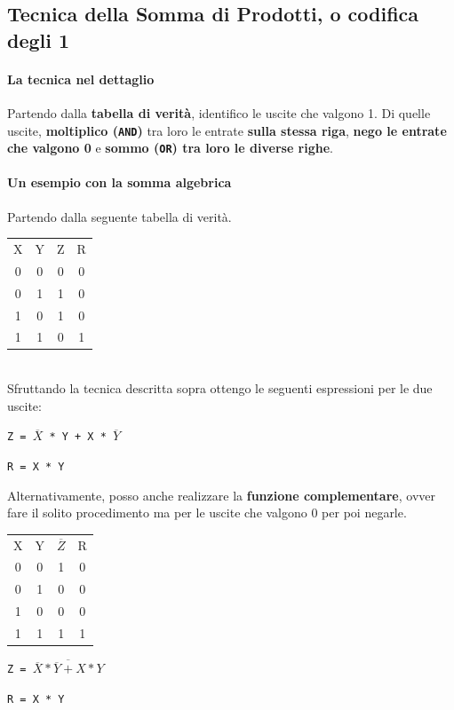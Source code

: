 \documentclass[10pt]{report}
\begin{document}
\subsection{Tecnica della Somma di Prodotti, o codifica degli 1}
\paragraph{La tecnica nel dettaglio} Partendo dalla \textbf{tabella di verità}, identifico le uscite che valgono 1. Di quelle uscite, \textbf{moltiplico (\texttt{AND})} tra loro le entrate \textbf{sulla stessa riga}, \textbf{nego le entrate che valgono 0} e \textbf{sommo (\texttt{OR}) tra loro le diverse righe}.
\paragraph{Un esempio con la somma algebrica} Partendo dalla seguente tabella di verità.\\
\begin{multicols}{2}
\begin{tabular}{cc|c|c}
X & Y & Z & R \\
0 & 0 & 0 & 0 \\
0 & 1 & 1 & 0 \\
1 & 0 & 1 & 0 \\
1 & 1 & 0 & 1\\
\end{tabular}
\columnbreak
\\Sfruttando la tecnica descritta sopra ottengo le seguenti espressioni per le due uscite:
\begin{list}{}{}
\item \texttt{Z = $\overline{X}$ * Y + X * $\overline{Y}$}
\item \texttt{R = X * Y}
\end{list}
\end{multicols}
Alternativamente, posso anche realizzare la \textbf{funzione complementare}, ovver fare il solito procedimento ma per le uscite che valgono 0 per poi negarle.\\
\begin{multicols}{2}
\begin{tabular}{cc|c|c}
X & Y & $\overline{Z}$ & R \\
0 & 0 & 1 & 0 \\
0 & 1 & 0 & 0 \\
1 & 0 & 0 & 0 \\
1 & 1 & 1 & 1\\
\end{tabular}
\columnbreak
\begin{list}{}{}
\item \texttt{Z = $\overline{\overline{X} * \overline{Y} + X * Y}$}
\item \texttt{R = X * Y}
\end{list}
\end{multicols}
\end{document}

